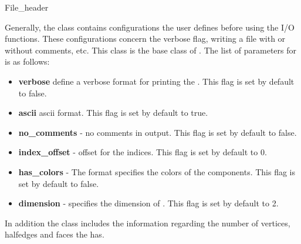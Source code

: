 
\ccRefPageBegin


\begin{ccRefClass}{File_header}


\ccDefinition
Generally, the \ccRefName \/ class contains configurations the user defines before using the I/O functions.
These configurations concern the verbose flag, writing a file with or without comments, etc.
This class is the base class of  .
The list of parameters for \ccRefName is as follows:

\begin{itemize}
\item {\bf verbose } define a verbose format for printing the . This flag is set by default to false.
\item {\bf ascii} ascii format. This flag is set by default to true.
\item {\bf no\_comments} - no comments in output. This flag is set by default to false.
\item {\bf index\_offset} - offset for the indices. This flag is set by default to 0.
\item {\bf has\_colors} - The format specifies the colors of the  components. This flag is set by default to false.
\item {\bf dimension} - specifies the dimension of . This flag is set by default to 2.
\end{itemize}

In addition the \ccRefName \/ class includes the information regarding the 
number of vertices, halfedges and faces the  has.




\end{ccRefClass}
